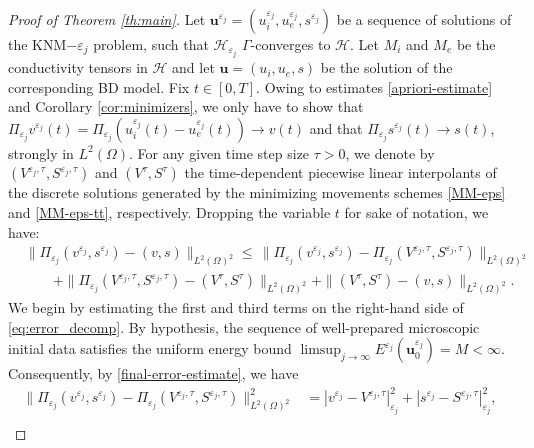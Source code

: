 \documentclass[10pt,a4paper]{amsart}
\newcommand{\e}{\varepsilon}
\begin{document}
\begin{proof}[Proof of Theorem \ref{th:main}]
Let $\mathbf{u}^{\e_j} = (u_i^{\e_j},u_e^{\e_j},s^{\e_j})$ be a sequence of  solutions of the KNM$-\e_j$ problem, such that $\mathcal H_{\e_j}$ $\Gamma$-converges to $\mathcal H$. Let $M_i$ and $M_e$ be the conductivity tensors in $\mathcal H$ and let $\mathbf{u}=(u_i,u_e,s)$ be the solution of the corresponding BD model. Fix $t \in [0, T]$. Owing to estimates \eqref{apriori-estimate} and Corollary \ref{cor:minimizers}, we only have to show that $\Pi_{\varepsilon_j} v^{\varepsilon_j}(t)=\Pi_{\varepsilon_j}\left(u_i^{\varepsilon_j}(t) - u_e^{\varepsilon_j}(t)\right) \to v(t)$ and that $\Pi_{\varepsilon_j} s^{\varepsilon_j}(t) \to s(t)$, strongly in $L^2(\Omega)$. For any given time step size $\tau > 0$, we denote by $(V^{\varepsilon_j,\tau},S^{\varepsilon_j,\tau})$ and $(V^\tau,S^\tau)$ the time-dependent piecewise linear interpolants of the discrete solutions generated by the minimizing movements schemes \eqref{MM-eps} and \eqref{MM-eps-tt}, respectively. Dropping the variable $t$ for sake of notation, we have:
\begin{equation}
	\label{eq:error_decomp}
	\begin{aligned}
		& \|\Pi_{\varepsilon_j}(v^{\varepsilon_j},s^{\varepsilon_j}) - (v,s)\|_{L^2(\Omega)^2}\leq \, \| \Pi_{\varepsilon_j}(v^{\varepsilon_j},s^{\varepsilon_j}) - \Pi_{\varepsilon_j}(V^{\varepsilon_j,\tau},S^{\varepsilon_j,\tau})\|_{L^2(\Omega)^2} \\
		&\quad \quad + \|\Pi_{\varepsilon_j}(V^{\varepsilon_j,\tau},S^{\varepsilon_j,\tau}) - (V^{\tau},S^{\tau})\|_{L^2(\Omega)^2} 
		+ \|(V^{\tau},S^{\tau}) - (v,s)\|_{L^2(\Omega)^2}.
	\end{aligned}
\end{equation}
We begin by estimating the first and third terms on the right-hand side of \eqref{eq:error_decomp}. By hypothesis, the sequence of well-prepared microscopic initial data satisfies the uniform energy bound $\limsup_{j \to \infty} E^{\varepsilon_j}(\mathbf{u}_0^{\varepsilon_j}) = M < \infty$. Consequently, by \eqref{final-error-estimate}, we have
\begin{equation}
	\label{eq:c1tau}
	\begin{aligned}
		\| \Pi_{\varepsilon_j}(v^{\varepsilon_j},s^{\varepsilon_j}) - \Pi_{\varepsilon_j}(V^{\varepsilon_j,\tau},S^{\varepsilon_j,\tau})\|_{L^2(\Omega)^2}^2  &= | v^{\varepsilon_j} -V^{\varepsilon_j,\tau}|_{\varepsilon_j}^2 +| s^{\varepsilon_j}-S^{\varepsilon_j,\tau}|_{\varepsilon_j}^2, \\

\end{aligned}
\end{equation}
\end{proof}
\end{document}
